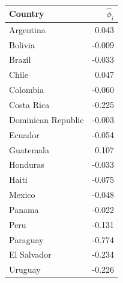 \begin{tabular}{lr}\toprule
Country & $\hat\phi_i$ \\
\midrule
Argentina & 0.043 \\
Bolivia & -0.009 \\
Brazil & -0.033 \\
Chile & 0.047 \\
Colombia & -0.060 \\
Costa Rica & -0.225 \\
Dominican Republic & -0.003 \\
Ecuador & -0.054 \\
Guatemala & 0.107 \\
Honduras & -0.033 \\
Haiti & -0.075 \\
Mexico & -0.048 \\
Panama & -0.022 \\
Peru & -0.131 \\
Paraguay & -0.774 \\
El Salvador & -0.234 \\
Uruguay & -0.226 \\
\bottomrule\end{tabular}
